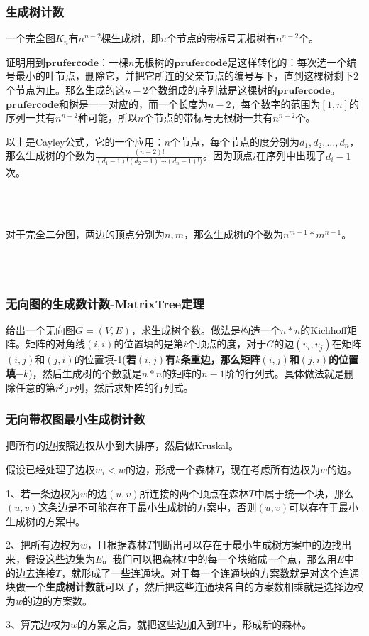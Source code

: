 \subsubsection{生成树计数}
	一个完全图$K_n$有$n^{n-2}$棵生成树，即$n$个节点的带标号无根树有$n^{n-2}$个。\par
	证明用到$\mathbf{prufer code}$：一棵$n$无根树的$\mathbf{prufer code}$是这样转化的：每次选一个编号最小的叶节点，删除它，并把它所连的父亲节点的编号写下，直到这棵树剩下2个节点为止。那么生成的这$n-2$个数组成的序列就是这棵树的$\mathbf{prufer code}$。$\mathbf{prufer code}$和树是一一对应的，而一个长度为$n-2$，每个数字的范围为$[1,n]$的序列一共有$n^{n-2}$种可能，所以$n$个节点的带标号无根树一共有$n^{n-2}$个。\par
	以上是Cayley公式，它的一个应用：$n$个节点，每个节点的度分别为$d_1,d_2,\ldots,d_n$，那么生成树的个数为$\frac{(n-2)!}{(d_1-1)!(d_2-1)!\cdots(d_n-1)!)}$。因为顶点$i$在序列中出现了$d_i-1$次。\par
	~\\
	~\\ \par
		对于完全二分图，两边的顶点分别为$n,m$，那么生成树的个数为$n^{m-1}*m^{n-1}$。\par
		~\\
		~\\ \par
\subsubsection{无向图的生成数计数-MatrixTree定理}
		给出一个无向图$G=(V,E)$，求生成树个数。做法是构造一个$n*n$的Kichhoff矩阵。矩阵的对角线$(i,i)$的位置填的是第$i$个顶点的度，对于$G$的边$(v_i,v_j)$在矩阵$(i,j)$和$(j,i)$的位置填-1(\textbf{若$(i,j)$有$k$条重边，那么矩阵$(i,j)$和$(j,i)$的位置填$-k$})，然后生成树的个数就是$n*n$的矩阵的$n-1$阶的行列式。具体做法就是删除任意的第$r$行$r$列，然后求矩阵的行列式。
	~\\
\subsubsection{无向带权图最小生成树计数}
		把所有的边按照边权从小到大排序，然后做Kruskal。\par
		假设已经处理了边权$w_i<w$的边，形成一个森林$T$，现在考虑所有边权为$w$的边。\par
		1、若一条边权为$w$的边$(u,v)$所连接的两个顶点在森林$T$中属于统一个块，那么$(u,v)$这条边是不可能存在于最小生成树的方案中，否则$(u,v)$可以存在于最小生成树的方案中。\par
		2、把所有边权为$w$，且根据森林$T$判断出可以存在于最小生成树方案中的边找出来，假设这些边集为$E$。我们可以把森林$T$中的每一个块缩成一个点，那么用$E$中的边去连接$T$，就形成了一些连通块。对于每一个连通块的方案数就是对这个连通块做一个\textbf{生成树计数}就可以了，然后把这些连通块各自的方案数相乘就是选择边权为$w$的边的方案数。\par
		3、算完边权为$w$的方案之后，就把这些边加入到$T$中，形成新的森林。\par
